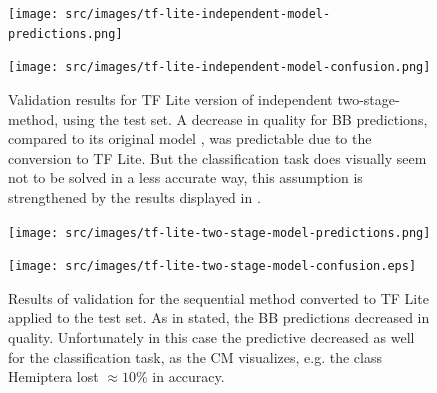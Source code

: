 \begin{figure}
    \centering
    \begin{multicols}{2}
        \begin{minipage}{.45\textwidth}
            \texttt{[image: src/images/tf-lite-independent-model-predictions.png]}
        \end{minipage}
        \columnbreak
        \begin{minipage}{.45\textwidth}
            \texttt{[image: src/images/tf-lite-independent-model-confusion.png]}
        \end{minipage}
    \end{multicols}
    \caption{Validation results for TF Lite version of independent two-stage-method, using the test set. A decrease in quality for BB predictions, compared to its original model , was predictable due to the conversion to TF Lite. But the classification task does visually seem not to be solved in a less accurate way, this assumption is strengthened by the results displayed in .}
    \label{fig:tflite-independent-results}
\end{figure}
\begin{figure}
    \centering
    \begin{multicols}{2}
        \begin{minipage}{.45\textwidth}
            \texttt{[image: src/images/tf-lite-two-stage-model-predictions.png]}
        \end{minipage}
        \columnbreak
        \begin{minipage}{.45\textwidth}
            \texttt{[image: src/images/tf-lite-two-stage-model-confusion.eps]}
        \end{minipage}
    \end{multicols}
    \caption{Results of validation for the sequential method converted to TF Lite applied to the test set. As in  stated, the BB predictions decreased in quality. Unfortunately in this case the predictive decreased as well for the classification task, as the CM visualizes, e.g. the class Hemiptera lost $\approx 10\%$ in accuracy.}
    \label{fig:tflite-sequential-results}
\end{figure}

